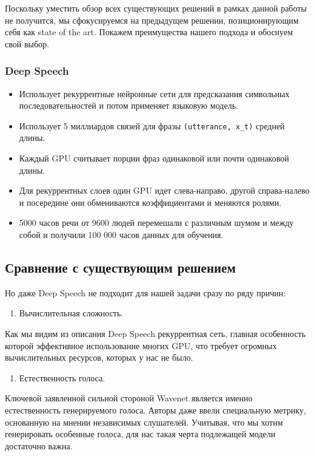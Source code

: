 \documentclass[../diploma.tex]{subfiles}
\begin{document}
Поскольку уместить обзор всех существующих решений в рамках данной работы не получится, мы сфокусируемся на предыдущем решении, позиционирующим себя как state of the art. Покажем преимущества нашего подхода и обоснуем свой выбор.

\subsubsection{Deep Speech}

\begin{itemize}
    \item Использует рекуррентные нейронные сети для предсказания символьных последовательностей и потом применяет языковую модель.
    \item Использует 5 миллиардов связей для фразы \verb|(utterance, x_t)| средней длины.
    \item Каждый GPU считывает порции фраз одинаковой или почти одинаковой длины.
    \item Для рекуррентных слоев один GPU идет слева-направо, другой справа-налево и посередине они обмениваются коэффициентами и меняются ролями.
    \item 5000 часов речи от 9600 людей перемешали с различным шумом и между собой и получили 100 000 часов данных для обучения.
\end{itemize}
\cite{article:hannun2014deep}


\subsection{Сравнение с существующим решением}

Но даже Deep Speech не подходит для нашей задачи сразу по ряду причин:
\begin{enumerate}
    \item Вычислительная сложность.
\end{enumerate}

Как мы видим из описания Deep Speech рекуррентная сеть, главная особенность которой эффективное использование многих GPU, что требует огромных вычислительных ресурсов, которых у нас не было. 
\begin{enumerate}[resume]
    \item Естественность голоса.
\end{enumerate}
Ключевой заявленной сильной стороной Wavenet является именно естественность генерируемого голоса. Авторы даже ввели специальную метрику, основанную на мнении независимых слушателей. Учитывая, что мы хотим генерировать особенные голоса, для нас такая черта подлежащей модели достаточно важна.
\end{document}
